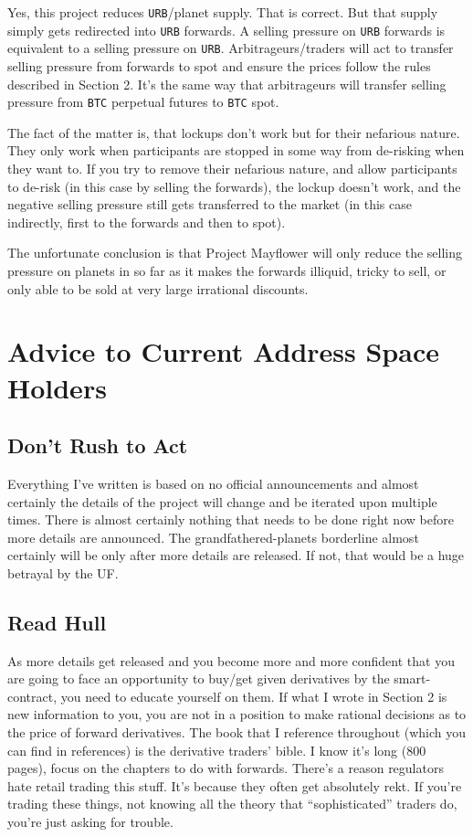 \documentclass{article}
\begin{document}
	Yes, this project reduces \texttt{URB}/planet supply. That is correct. But that supply simply gets redirected into \texttt{URB} forwards. A selling pressure on \texttt{URB} forwards is equivalent to a selling pressure on \texttt{URB}. Arbitrageurs/traders will act to transfer selling pressure from forwards to spot and ensure the prices follow the rules described in Section 2. It's the same way that arbitrageurs will transfer selling pressure from \texttt{BTC} perpetual futures to \texttt{BTC} spot.
	
	The fact of the matter is, that lockups don't work but for their nefarious nature. They only work when participants are stopped in some way from de-risking when they want to. If you try to remove their nefarious nature, and allow participants to de-risk (in this case by selling the forwards), the lockup doesn't work, and the negative selling pressure still gets transferred to the market (in this case indirectly, first to the forwards and then to spot).
	
	The unfortunate conclusion is that Project Mayflower will only reduce the selling pressure on planets in so far as it makes the forwards illiquid, tricky to sell, or only able to be sold at very large irrational discounts.
	
	\section{Advice to Current Address Space Holders}
	\subsection{Don't Rush to Act}
	Everything I've written is based on no official announcements and almost certainly the details of the project will change and be iterated upon multiple times. There is almost certainly nothing that needs to be done right now before more details are announced. The grandfathered-planets borderline almost certainly will be only after more details are released. If not, that would be a huge betrayal by the UF.
	
	\subsection{Read Hull}
	As more details get released and you become more and more confident that you are going to face an opportunity to buy/get given derivatives by the smart-contract, you need to educate yourself on them. If what I wrote in Section 2 is new information to you, you are not in a position to make rational decisions as to the price of forward derivatives. The book that I reference throughout (which you can find in references) is the derivative traders' bible. I know it's long (800 pages), focus on the chapters to do with forwards. There's a reason regulators hate retail trading this stuff. It's because they often get absolutely rekt. If you're trading these things, not knowing all the theory that ``sophisticated'' traders do, you're just asking for trouble.
	
\end{document}
